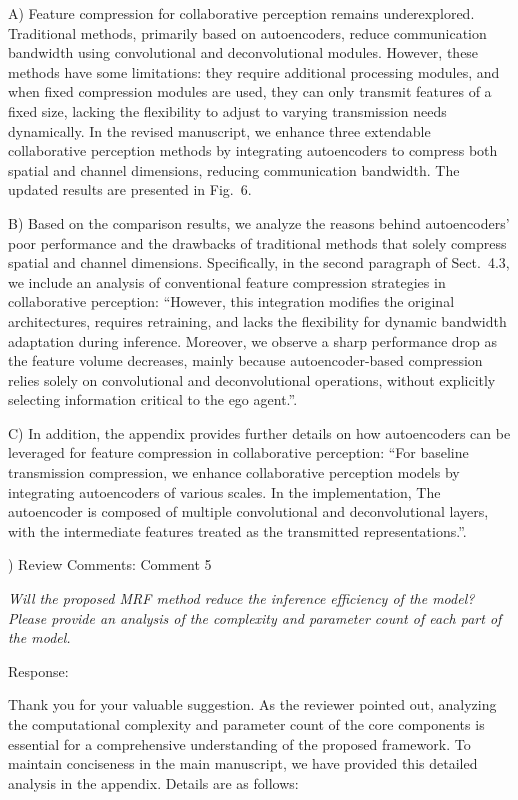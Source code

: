 \documentclass[12pt,a4paper]{article}
\begin{document}
A) Feature compression for collaborative perception remains underexplored. Traditional methods, primarily based on autoencoders, reduce communication bandwidth using convolutional and deconvolutional modules. However, these methods have some limitations: they require additional processing modules, and when fixed compression modules are used, they can only transmit features of a fixed size, lacking the flexibility to adjust to varying transmission needs dynamically.
In the revised manuscript, we enhance three extendable collaborative perception methods by integrating autoencoders to compress both spatial and channel dimensions, reducing communication bandwidth. The updated results are presented in Fig.~6.

B) Based on the comparison results, we analyze the reasons behind autoencoders' poor performance and the drawbacks of traditional methods that solely compress spatial and channel dimensions.  
Specifically, in the second paragraph of Sect.~4.3, we include an analysis of conventional feature compression strategies in collaborative perception: ``However, this integration modifies the original architectures, requires retraining, and lacks the flexibility for dynamic bandwidth adaptation during inference. Moreover, we observe a sharp performance drop as the feature volume decreases, mainly because autoencoder-based compression relies solely on convolutional and deconvolutional operations, without explicitly selecting information critical to the ego agent.''.

C) In addition, the appendix provides further details on how autoencoders can be leveraged for feature compression in collaborative perception: ``For baseline transmission compression, we enhance collaborative perception models by integrating autoencoders of various scales. In the implementation,  The autoencoder is composed of multiple convolutional and deconvolutional layers, with the intermediate features treated as the transmitted representations.''.


\vspace{4ex}
) Review Comments: Comment 5

\textit{Will the proposed MRF method reduce the inference efficiency of the model? Please provide an analysis of the complexity and parameter count of each part of the model.}

\noindent Response:

Thank you for your valuable suggestion. As the reviewer pointed out, analyzing the computational complexity and parameter count of the core components is essential for a comprehensive understanding of the proposed framework. To maintain conciseness in the main manuscript, we have provided this detailed analysis in the appendix.
Details are as follows:
\end{document}
